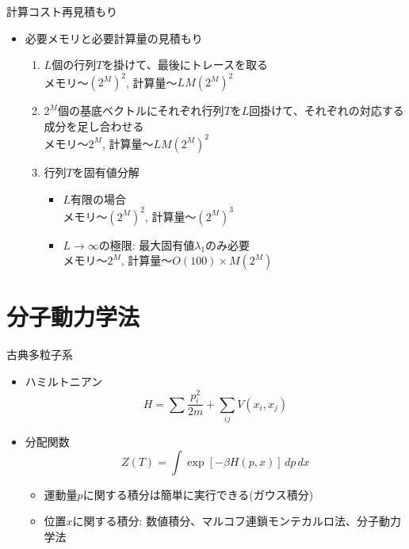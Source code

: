 \documentclass[dvipdfmx]{beamer}
\begin{document}
\begin{frame}[t,fragile]{計算コスト再見積もり}
  \begin{itemize}
    \setlength{\itemsep}{1em}
  \item 必要メモリと必要計算量の見積もり
    \begin{enumerate}
    \item $L$個の行列$T$を掛けて、最後にトレースを取る \\
      メモリ〜$(2^M)^2$, 計算量〜$LM(2^M)^2$
    \item $2^M$個の基底ベクトルにそれぞれ行列$T$を$L$回掛けて、それぞれの対応する成分を足し合わせる \\
      メモリ〜$2^M$, 計算量〜$LM(2^M)^2$
    \item 行列$T$を固有値分解
      \begin{itemize}
        \item $L$有限の場合 \\
          メモリ〜$(2^M)^2$, 計算量〜$(2^M)^3$
        \item $L\rightarrow\infty$の極限: 最大固有値$\lambda_1$のみ必要 \\
          メモリ〜$2^M$, 計算量〜$O(100)\times M(2^M)$
      \end{itemize}
    \end{enumerate}
  \end{itemize}
\end{frame}



\section{分子動力学法}

\begin{frame}[t,fragile]{古典多粒子系}
  \begin{itemize}
    \setlength{\itemsep}{1em}
  \item ハミルトニアン
    \[
    H = \sum \frac{p_i^2}{2m} + \sum_{ij} V(x_i, x_j)
    \]
  \item 分配関数
    \[
    Z(T) = \int \exp [- \beta H(p,x) ] \, dp \, dx
    \]
    \begin{itemize}
    \item 運動量$p$に関する積分は簡単に実行できる(ガウス積分)
    \item 位置$x$に関する積分: 数値積分、マルコフ連鎖モンテカルロ法、分子動力学法
    \end{itemize}
  \end{itemize}
\end{frame}
\end{document}
